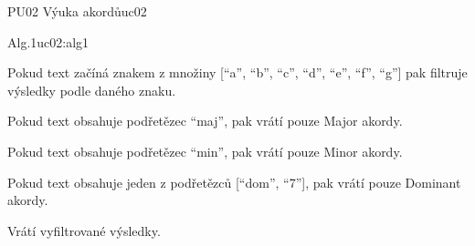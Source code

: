 \begin{usecase}{PU02 Výuka akordů}{uc02}
    \begin{scenario}{Alg.1}{uc02:alg1}
        \item Pokud text začíná znakem z množiny [\enquote{a}, \enquote{b}, \enquote{c}, \enquote{d}, \enquote{e}, \enquote{f}, \enquote{g}] pak filtruje výsledky podle daného znaku.
        \item Pokud text obsahuje podřetězec \enquote{maj}, pak vrátí pouze Major akordy.
        \item Pokud text obsahuje podřetězec \enquote{min}, pak vrátí pouze Minor akordy.
        \item Pokud text obsahuje jeden z podřetězců [\enquote{dom}, \enquote{7}], pak vrátí pouze Dominant akordy.
        \item Vrátí vyfiltrované výsledky.        
    \end{scenario}
\end{usecase}